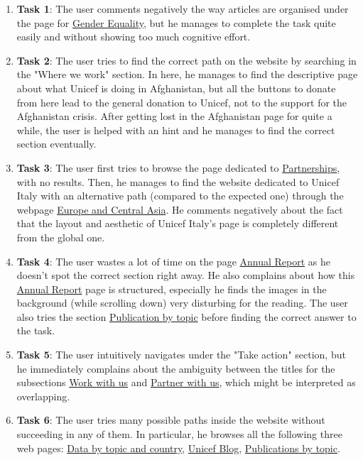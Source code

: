\begin{enumerate}
	\item \textbf{Task 1}: The user comments negatively the way articles are organised under the page for \href{https://www.unicef.org/gender-equality}{Gender Equality}, but he manages to complete the task quite easily and without showing too much cognitive effort.
	\item \textbf{Task 2}: The user tries to find the correct path on the website by searching in the "Where we work" section. In here, he manages to find the descriptive page about what Unicef is doing in Afghanistan, but all the buttons to donate from here lead to the general donation to Unicef, not to the support for the Afghanistan crisis. After getting lost in the Afghanistan page for quite a while, the user is helped with an hint and he manages to find the correct section eventually.
	\item \textbf{Task 3}: The user first tries to browse the page dedicated to \href{https://www.unicef.org/partnerships}{Partnerships}, with no results. Then, he manages to find the website dedicated to Unicef Italy with an alternative path (compared to the expected one) through the webpage \href{https://www.unicef.org/eca/}{Europe and Central Asia}. He comments negatively about the fact that the layout and aesthetic of Unicef Italy's page is completely different from the global one.
	\item \textbf{Task 4}: The user wastes a lot of time on the page \href{https://www.unicef.org/reports/unicef-annual-report-2022}{Annual Report} as he doesn't spot the correct section right away. He also complains about how this \href{https://www.unicef.org/reports/unicef-annual-report-2022}{Annual Report} page is structured, especially he finds the images in the background (while scrolling down) very disturbing for the reading. The user also tries the section \href{https://www.unicef.org/reports}{Publication by topic} before finding the correct answer to the task.
	\item \textbf{Task 5}: The user intuitively navigates under the "Take action" section, but he immediately complains about the ambiguity between the titles for the subsections \href {https://www.unicef.org/careers/}{Work with us} and \href{https://www.unicef.org/partnerships}{Partner with us}, which might be interpreted as overlapping.
	\item \textbf{Task 6}: The user tries many possible paths inside the website without succeeding in any of them. In particular, he browses all the following three web pages: \href{https://data.unicef.org/?_gl=1\%2A1he5ywc\%2A_ga\%2AMTEzMTU1MTkxOS4xNzEwMTk2NDI2\%2A_ga_ZEPV2PX419\%2AMTcxMjYxMDM0Ni4yNi4xLjE3MTI2MTUzNDEuNjAuMC4w}{Data by topic and country}, \href{https://www.unicef.org/blog}{Unicef Blog}, \href{https://www.unicef.org/reports}{Publications by topic}.
	
\end{enumerate}

